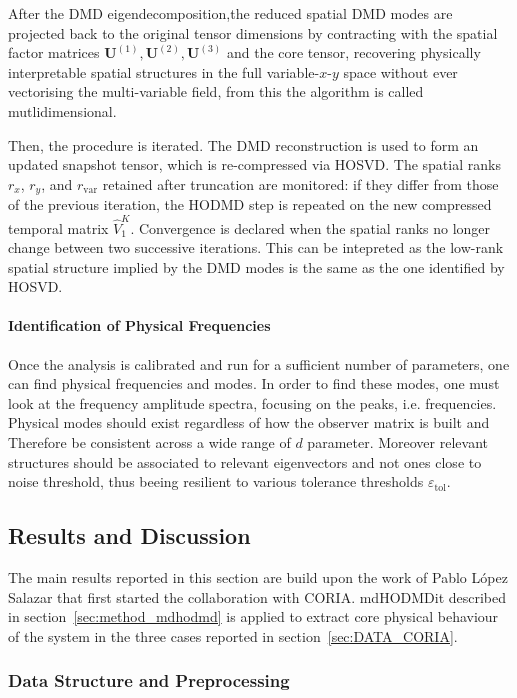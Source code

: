 After the DMD eigendecomposition,the reduced spatial DMD modes are projected back to the original tensor dimensions by contracting with the spatial
factor matrices $\mathbf{U}^{(1)}, \mathbf{U}^{(2)}, \mathbf{U}^{(3)}$ and the core tensor, recovering physically interpretable spatial structures in the full variable-$x$-$y$ space without ever vectorising the multi-variable field, from this the algorithm is called mutlidimensional.

Then, the procedure is iterated. The DMD reconstruction is used to form an updated snapshot tensor, which is re-compressed via HOSVD. The spatial ranks $r_x$, $r_y$, and $r_{\mathrm{var}}$ retained after truncation are monitored: if they
differ from those of the previous iteration, the HODMD step is repeated on the new compressed temporal matrix $\hat{V}_1^K$. Convergence is declared when the spatial ranks no longer change between two successive iterations. This can be intepreted as the low-rank spatial  structure implied by the DMD modes is the same as the one identified by HOSVD.

\paragraph{Identification of Physical Frequencies}
\label{sec:coria_frequencies}
Once the analysis is calibrated and run for a sufficient number of parameters, one can find physical frequencies and modes. In order to find these modes, one must look at the frequency amplitude spectra, focusing on the peaks, i.e. frequencies. Physical modes should exist regardless of how the observer matrix is built and Therefore be consistent across a wide range of $d$ parameter. Moreover relevant structures should be associated to relevant eigenvectors and not ones close to noise threshold, thus beeing resilient to various tolerance thresholds $\varepsilon_{\mathrm{tol}}$.

\subsection{Results and Discussion}
\label{sec:results_coria}

The main results reported in this section are build upon the work of Pablo López Salazar that first started the collaboration with CORIA. mdHODMDit described in section~\ref{sec:method_mdhodmd} is applied to extract core physical behaviour of the system in the three cases reported in section~\ref{sec:DATA_CORIA}.

\subsubsection{Data Structure and Preprocessing}
\label{sec:coria_preprocessing}

